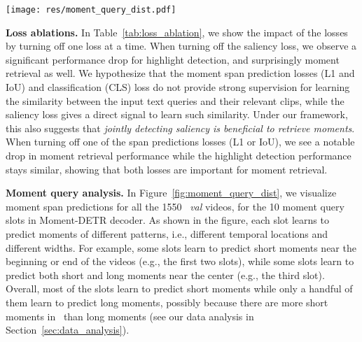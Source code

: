 \begin{figure*}[t]
    \centering
    \texttt{[image: res/moment\_query\_dist.pdf]}
    \caption{Visualization of all moment span predictions for all the 1550 videos on \DatasetName~val split, for all the 10 moment query slots in Moment-DETR decoder. x-axis denotes the normalized moment span center coordinates w.r.t. the videos, y-axis denotes the normalized moment span width (also indicated by color). We observe that each slot learns to predict moments in different temporal locations and different widths. For example, the first slot mostly predicts short moments near the beginning of the videos, while the second slot mostly predicts short moments near the end.}
    \label{fig:moment_query_dist}
    \vspace{-5pt}
\end{figure*}
  

\textbf{Loss ablations.}
In Table~\ref{tab:loss_ablation}, we show the impact of the losses by turning off one loss at a time. 
When turning off the saliency loss, we observe a significant performance drop for highlight detection, and surprisingly moment retrieval as well. 
We hypothesize that the moment span prediction losses (L1 and IoU) and classification (CLS) loss do not provide strong supervision for learning the similarity between the input text queries and their relevant clips, while the saliency loss gives a direct signal to learn such similarity.
Under our framework, this also suggests that \emph{jointly detecting saliency is beneficial to retrieve moments}. 
When turning off one of the span predictions losses (L1 or IoU), we see a notable drop in moment retrieval performance while the highlight detection performance stays similar, showing that both losses are important for moment retrieval. 


\textbf{Moment query analysis.}
In Figure~\ref{fig:moment_query_dist}, we visualize moment span predictions for all the 1550 \DatasetName~\textit{val} videos, for the 10 moment query slots in Moment-DETR decoder. As shown in the figure, each slot learns to predict moments of different patterns, i.e., different temporal locations and different widths. 
For example, some slots learn to predict short moments near the beginning or end of the videos (e.g., the first two slots), while some slots learn to predict both short and long moments near the center (e.g., the third slot).
Overall, most of the slots learn to predict short moments while only a handful of them learn to predict long moments, possibly because there are more short moments in \DatasetName~than long moments (see our data analysis in Section~\ref{sec:data_analysis}). 




